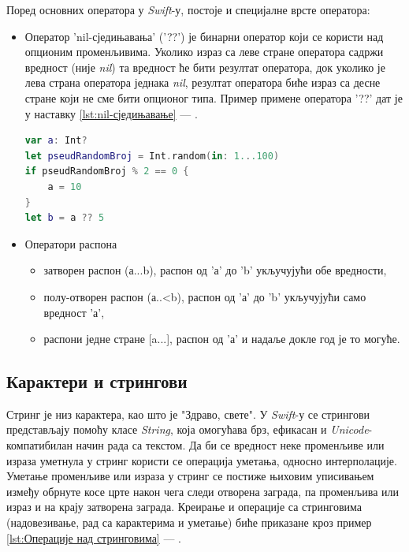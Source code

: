 \documentclass[12pt,oneside]{memoir}
\begin{document}
\indent Поред основних оператора у \textit{Swift}-у, постоје и специјалне врсте оператора:

\begin{itemize}
    \item Оператор 'nil-сједињавања' ('??') је бинарни оператор који се користи над опционим променљивима. Уколико израз са леве стране оператора садржи вредност (није \textit{nil}) та вредност ће бити резултат оператора, док уколико је лева страна оператора једнака  \textit{nil}, резултат оператора биће израз са десне стране који не сме бити опционог типа. Пример примене оператора '??' дат је у наставку \ref{lst:nil-сједињавање} --- .
    
\begin{lstlisting}[caption=\textit{{nil-сједињавање}}, label={lst:nil-сједињавање}, language=Swift, frame=single]
var a: Int?
let pseudRandomBroj = Int.random(in: 1...100)
if pseudRandomBroj % 2 == 0 {
    a = 10
}
let b = a ?? 5
\end{lstlisting}
    
    \item Оператори распона
    
\begin{itemize}
    \item затворен распон (а...b), распон од 'а' до 'b' укључујући обе вредности,
    \item полу-отворен распон (а..<b), распон од 'а' до 'b' укључујући само вредност 'а',
    \item распони једне стране [a...], распон од 'а' и надаље докле год је то могуће.
\end{itemize}

\end{itemize}

\subsection{Карактери и стрингови}

\indent Стринг је низ карактера, као што је "Здраво, свете". У \textit{Swift}-у се стрингови представљају помоћу класе \textit{String}, која омогућава брз, ефикасан и \textit{Unicode}-компатибилан начин рада са текстом. Да би се вредност неке променљиве или израза уметнула у стринг користи се операција уметања, односно интерполације. Уметање променљиве или израза у стринг се постиже њиховим уписивањем између обрнуте косе црте након чега следи отворена заграда, па променљива или израз и на крају затворена заграда. Креирање и операције са стринговима (надовезивање, рад са карактерима и уметање) биће приказане кроз пример \ref{lst:Операције над стринговима} --- .
\end{document}
